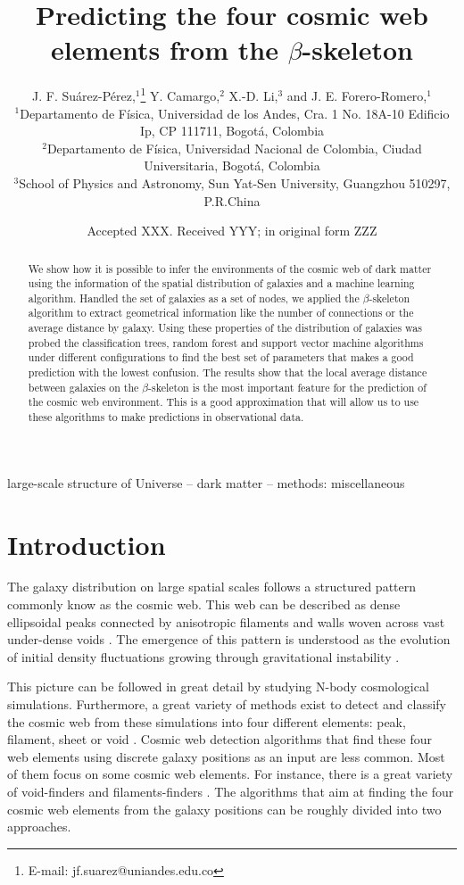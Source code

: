 \documentclass[usenatbib]{mnras}
\title[Cosmic web elements and the $\beta$-skeleton]{Predicting the four cosmic web
  elements from the $\beta$-skeleton}
\author[J. F. Su\'arez-P\'erez et al.]{
J. F. Su\'arez-P\'erez,$^{1}$\thanks{E-mail: jf.suarez@uniandes.edu.co}
Y. Camargo,$^{2}$ 
X.-D. Li,$^{3}$
and J. E. Forero-Romero,$^{1}$
\\
$^{1}$Departamento de F\'isica, Universidad de los Andes, Cra. 1 No. 18A-10 Edificio Ip, CP 111711, Bogot\'a, Colombia\\
$^{2}$Departamento de F\'isica, Universidad Nacional de Colombia, Ciudad Universitaria, Bogot\'a, Colombia\\
$^{3}$School of Physics and Astronomy, Sun Yat-Sen University, Guangzhou 510297, P.R.China\\
}
\date{Accepted XXX. Received YYY; in original form ZZZ}
\begin{document}
\label{firstpage}
\pagerange{\pageref{firstpage}--\pageref{lastpage}}
\maketitle

\begin{abstract}
We show how it is possible to infer the environments of the cosmic web
of dark matter using the information of the spatial distribution of
galaxies and a machine learning algorithm. 
Handled the set of galaxies as a set of nodes, we applied the
$\beta$-skeleton algorithm to extract geometrical information like the
number of connections or the average distance by galaxy. 
Using these properties of the distribution of galaxies was probed the
classification trees, random forest and support vector machine algorithms under different
configurations to find the best set of parameters that makes a good
prediction with the lowest confusion.  
The results show that the local average distance between galaxies on
the $\beta$-skeleton is the most important feature for the prediction
of the cosmic web environment. 
This is a good approximation that will allow us to use these
algorithms to make predictions in observational data.  
\end{abstract}

\begin{keywords}
large-scale structure of Universe -- dark matter -- methods: miscellaneous
\end{keywords}


\section{Introduction}
The galaxy distribution on large spatial scales follows a structured 
pattern commonly know as the cosmic web. 
This web can be described as dense ellipsoidal peaks connected by
anisotropic filaments and walls woven across vast under-dense voids
\citep{Bond1996}. 
The emergence of this pattern is understood as the evolution of
initial density fluctuations growing through gravitational instability
\citep{ZelDovich1970,White1987}.   

This picture can be followed in great detail by studying N-body
cosmological simulations.   
Furthermore, a great variety of methods exist to detect and
classify the cosmic web from these simulations into four different 
elements: peak, filament, sheet or void \citep{Libeskind2018}.  
Cosmic web detection algorithms that find these four web
elements using discrete galaxy positions as an input are less
common. 
Most of them focus on some cosmic web elements.
For instance, there is a great variety of void-finders
\citep{Platen2007,Neyrinck2008} and filaments-finders
\citep{Novikov2003,Zhang2009,Sousbie2010,Chen2015,Luber2019}.   
The algorithms that aim at finding the four cosmic web elements from
the galaxy positions can be roughly divided into two approaches.
\end{document}
